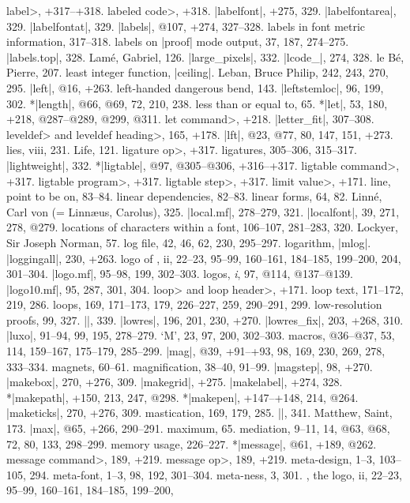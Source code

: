\<label>, +317--+318.
\<labeled code>, +318.
|labelfont|, +275, 329.
|labelfontarea|, 329.
|labelfontat|, 329.
|labels|, @107, +274, 327--328.
labels in font metric information, 317--318.
labels on |proof| mode output, 37, 187, 274--275.
|labels.top|, 328.
Lam\'e, Gabriel, 126.
|large_pixels|, 332.
|lcode_|, 274, 328.
le B\'e, Pierre, 207.
least integer function, \see |ceiling|.
Leban, Bruce Philip, 242, 243, 270, 295.
|left|, @16, +263.
left-handed dangerous bend, 143.
|leftstemloc|, 96, 199, 302.
*|length|, @66, @69, 72, 210, 238.
less than or equal to, 65.
*|let|, 53, 180, +218, @287--@289, @299, @311.
\<let command>, +218.
|letter_fit|, 307--308.
\<leveldef> and \<leveldef heading>, 165, +178.
|lft|, @23, @77, 80, 147, 151, +273.
lies, viii, 231.
Life, 121.
\<ligature op>, +317.
ligatures, 305--306, 315--317.
|lightweight|, 332.
*|ligtable|, @97, @305--@306, +316--+317.
\<ligtable command>, +317.
\<ligtable program>, +317.
\<ligtable step>, +317.
\<limit value>, +171.
line, point to be on, 83--84.
linear dependencies, 82--83.
linear forms, 64, 82.
Linn\'e, Carl von (= Linn\ae us, Carolus), 325.
|local.mf|, 278--279, 321.
|localfont|, 39, 271, 278, @279.
locations of characters within a font, 106--107, 281--283, 320.
Lockyer, Sir Joseph Norman, 57.
log file, 42, 46, 62, 230, 295--297.
logarithm, \see |mlog|.
|loggingall|, 230, +263.
logo of \MF, ii, 22--23, 95--99, 160--161, 184--185, 199--200, 204, 301--304.
|logo.mf|, 95--98, 199, 302--303.
logos, {\it i},  97, @114, @137--@139.
|logo10.mf|, 95, 287, 301, 304.
\<loop> and \<loop header>, +171.
loop text, 171--172, 219, 286.
loops, 169, 171--173, 179, 226--227, 259, 290--291, 299.
low-resolution proofs, 99, 327.
|\lowers|, 339.
|lowres|, 196, 201, 230, +270.
|lowres_fix|, 203, +268, 310.
|luxo|, 91--94, 99, 195, 278--279.
\newletter
`M', 23, 97, 200, 302--303.
macros, @36--@37, 53, 114, 159--167, 175--179, 285--299.
|mag|, @39, +91--+93, 98, 169, 230, 269, 278, 333--334.
magnets, 60--61.
magnification, 38--40, 91--99.
|magstep|, 98, +270.
|makebox|, 270, +276, 309.
|makegrid|, +275.
|makelabel|, +274, 328.
*|makepath|, +150, 213, 247, @298.
*|makepen|, +147--+148, 214, @264.
|maketicks|, 270, +276, 309.
mastication, 169, 179, 285.
|\math|, 341.
Matthew, Saint, 173.
|max|, @65, +266, 290--291.
maximum, 65.
mediation, 9--11, 14, @63, @68, 72, 80, 133, 298--299.
memory usage, 226--227.
*|message|, @61, +189, @262.
\<message command>, 189, +219.
\<message op>, 189, +219.
meta-design, 1--3, 103--105, 294.
meta-font, 1--3, 98, 192, 301--304.
meta-ness, 3, 301.
\MF, the logo, ii, 22--23, 95--99, 160--161, 184--185, 199--200,
